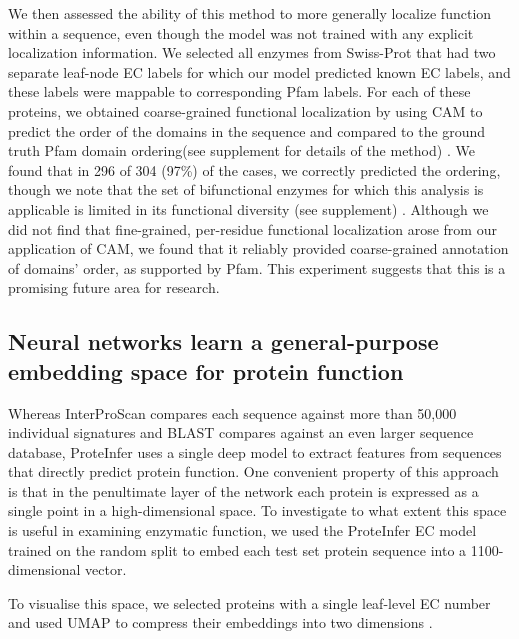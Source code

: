 
We then assessed the ability of this method to more generally localize function within a sequence, even though the model was not trained with any explicit localization information. We selected all enzymes from Swiss-Prot that had two separate leaf-node EC labels for which our model predicted known EC labels, and these labels were mappable to corresponding Pfam labels. For each of these proteins, we obtained coarse-grained functional localization by using CAM to predict the order of the domains in the sequence and compared to the ground truth Pfam domain ordering\textnormal{(see supplement for details of the method)}%
. We found that in 296 of 304 (97\%) of the cases, we correctly predicted the ordering, though we note that the set of bifunctional enzymes for which this analysis is applicable is limited in its functional diversity \textnormal{(see supplement)}%
. Although we did not find that fine-grained, per-residue functional localization arose from our application of CAM, we found that it reliably provided coarse-grained annotation of domains' order, as supported by Pfam. This experiment suggests that this is a promising future area for research.
\subsection*{Neural networks learn a general-purpose embedding space for protein function}
Whereas InterProScan compares each sequence against more than 50,000 %
individual signatures and BLAST compares against an even larger sequence database, ProteInfer uses a single deep model to extract features from sequences that directly predict protein function. One convenient property of this approach is that in the penultimate layer of the network each protein is expressed as a single point in a high-dimensional space. To investigate to what extent this space is useful in examining enzymatic function, we used the ProteInfer EC model trained on the random split to embed each test set protein sequence into a 1100-dimensional vector. 

To visualise this space, we selected proteins with a single leaf-level EC number and used UMAP to compress their embeddings into two dimensions \citep{umap}.


